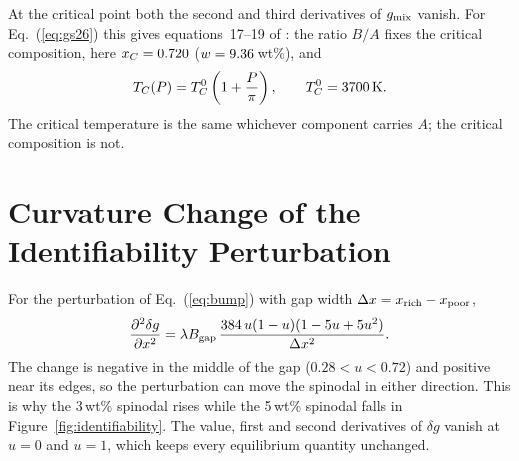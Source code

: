 At the critical point both the second and third derivatives of $g_{\rm mix}$ vanish. For
Eq.~(\ref{eq:gs26}) this gives equations~17--19 of \cite{gilmore2026}: the ratio $B/A$ fixes
the critical composition, here $x_C = 0.720{}$ ($w = 9.36{}$\,wt\%), and
\begin{equation}
T_C(P) = T_C^0\left(1+\frac{P}{\pi}\right), \qquad T_C^0 = 3700{}\,{\rm K}.
\end{equation}
The critical temperature is the same whichever component carries $A$; the critical
composition is not.

\section{Curvature Change of the Identifiability Perturbation}

For the perturbation of Eq.~(\ref{eq:bump}) with gap width $\Delta x = x_{\rm rich} -
x_{\rm poor}$,
\begin{equation}
\frac{\partial^2 \delta g}{\partial x^2}
= \lambda B_{\rm gap}\,\frac{384\,u(1-u)(1-5u+5u^2)}{\Delta x^2}.
\end{equation}
The change is negative in the middle of the gap ($0.28 < u < 0.72$) and positive near its
edges, so the perturbation can move the spinodal in either direction. This is why the 3\,wt\% spinodal
rises while the 5\,wt\% spinodal falls in Figure~\ref{fig:identifiability}. The value,
first and second derivatives of $\delta g$ vanish at $u=0$ and $u=1$, which keeps every
equilibrium quantity unchanged.
